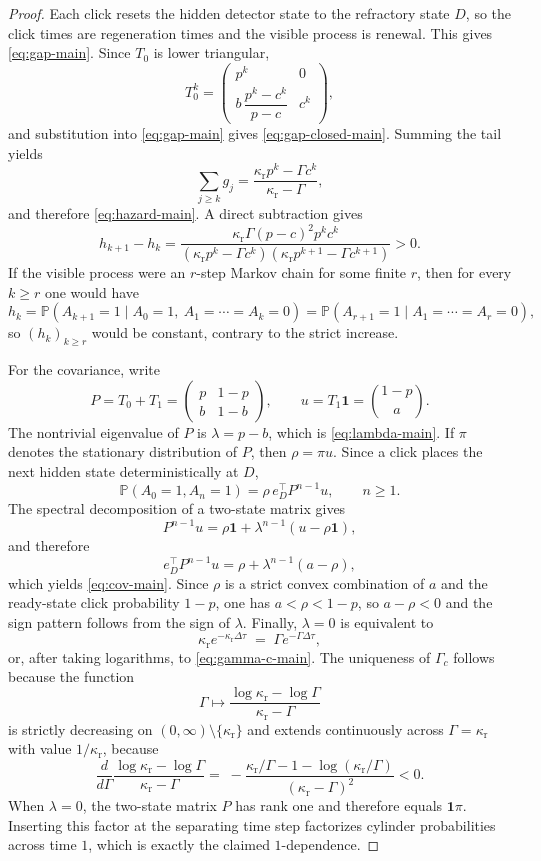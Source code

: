 \documentclass[11pt]{amsart}
\numberwithin{equation}{section}
\theoremstyle{remark}
\newcommand{\PP}{\mathbb{P}}
\begin{document}
\begin{proof}
Each click resets the hidden detector state to the refractory state $D$, so the click times are regeneration times and the visible process is renewal. This gives \eqref{eq:gap-main}. Since $T_0$ is lower triangular,
\[
T_0^k=
\begin{pmatrix}
p^k & 0\\[0.4ex]
b\,\dfrac{p^k-c^k}{p-c} & c^k
\end{pmatrix},
\]
and substitution into \eqref{eq:gap-main} gives \eqref{eq:gap-closed-main}. Summing the tail yields
\[
\sum_{j\ge k}g_j=\frac{\kappa_{\mathrm r}p^k-\Gamma c^k}{\kappa_{\mathrm r}-\Gamma},
\]
and therefore \eqref{eq:hazard-main}. A direct subtraction gives
\[
h_{k+1}-h_k=
\frac{\kappa_{\mathrm r}\Gamma(p-c)^2p^kc^k}
{(\kappa_{\mathrm r}p^k-\Gamma c^k)(\kappa_{\mathrm r}p^{k+1}-\Gamma c^{k+1})}>0.
\]
If the visible process were an $r$-step Markov chain for some finite $r$, then for every $k\ge r$ one would have
\[
h_k
=
\PP(A_{k+1}=1\mid A_0=1,\ A_1=\cdots=A_k=0)
=
\PP(A_{r+1}=1\mid A_1=\cdots=A_r=0),
\]
so $(h_k)_{k\ge r}$ would be constant, contrary to the strict increase.

For the covariance, write
\[
P=T_0+T_1=
\begin{pmatrix}
p & 1-p\\
b & 1-b
\end{pmatrix},
\qquad
u=T_1\mathbf 1=\binom{1-p}{a}.
\]
The nontrivial eigenvalue of $P$ is $\lambda=p-b$, which is \eqref{eq:lambda-main}. If $\pi$ denotes the stationary distribution of $P$, then $\rho=\pi u$. Since a click places the next hidden state deterministically at $D$,
\[
\PP(A_0=1,A_n=1)=\rho\,e_D^\top P^{n-1}u,\qquad n\ge1.
\]
The spectral decomposition of a two-state matrix gives
\[
P^{n-1}u=\rho\mathbf 1+\lambda^{n-1}(u-\rho\mathbf 1),
\]
and therefore
\[
e_D^\top P^{n-1}u=\rho+\lambda^{n-1}(a-\rho),
\]
which yields \eqref{eq:cov-main}. Since $\rho$ is a strict convex combination of $a$ and the ready-state click probability $1-p$, one has $a<\rho<1-p$, so $a-\rho<0$ and the sign pattern follows from the sign of $\lambda$. Finally, $\lambda=0$ is equivalent to
\[
\kappa_{\mathrm r}e^{-\kappa_{\mathrm r}\Delta\tau}
\;=\;
\Gamma e^{-\Gamma\Delta\tau},
\]
or, after taking logarithms, to \eqref{eq:gamma-c-main}. The uniqueness of $\Gamma_c$ follows because the function
\[
\Gamma\longmapsto \frac{\log\kappa_{\mathrm r}-\log\Gamma}{\kappa_{\mathrm r}-\Gamma}
\]
is strictly decreasing on $(0,\infty)\setminus\{\kappa_{\mathrm r}\}$ and extends continuously across $\Gamma=\kappa_{\mathrm r}$ with value $1/\kappa_{\mathrm r}$, because
\[
\frac{d}{d\Gamma}
\frac{\log\kappa_{\mathrm r}-\log\Gamma}{\kappa_{\mathrm r}-\Gamma}
=
\;-\frac{\kappa_{\mathrm r}/\Gamma-1-\log(\kappa_{\mathrm r}/\Gamma)}
        {(\kappa_{\mathrm r}-\Gamma)^2}<0.
\]
When $\lambda=0$, the two-state matrix $P$ has rank one and therefore equals $\mathbf 1\pi$. Inserting this factor at the separating time step factorizes cylinder probabilities across time $1$, which is exactly the claimed $1$-dependence.
\end{proof}
\end{document}
